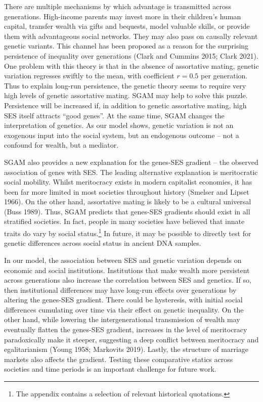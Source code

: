 \documentclass[
]{article}
\theoremstyle{definition}
\theoremstyle{definition}
\theoremstyle{definition}
\theoremstyle{definition}
\theoremstyle{remark}
\begin{document}
There are multiple mechanisms by which advantage is transmitted across
generations. High-income parents may invest more in their children's human
capital, transfer wealth via gifts and bequests, model valuable skills, or
provide them with advantageous social networks. They may also pass on causally
relevant genetic variants. This channel has been proposed as a reason for the
surprising persistence of inequality over generations
(Clark and Cummins 2015; Clark 2021). One problem with this theory is
that in the absence of assortative mating, genetic variation regresses swiftly
to the mean, with coefficient \(r = 0.5\) per generation. Thus to explain long-run
persistence, the genetic theory seems to require very high levels of genetic
assortative mating. SGAM may help to solve this puzzle. Persistence will be
increased if, in addition to genetic assortative mating, high SES itself
attracts ``good genes''. At the same time, SGAM changes the interpretation of
genetics. As our model shows, genetic variation is not an exogenous input into
the social system, but an endogenous outcome -- not a confound for wealth, but a mediator.

SGAM also provides a new explanation for the genes-SES gradient -- the observed
association of genes with SES. The leading alternative explanation is
meritocratic social mobility. Whilst meritocracy exists in modern capitalist
economies, it has been far more limited in most societies throughout history
(Smelser and Lipset 1966). On the other hand, assortative mating is likely to be a
cultural universal (Buss 1989). Thus, SGAM predicts that genes-SES gradients
should exist in all stratified societies. In fact, people in many societies have
believed that innate traits do vary by social status.\footnote{The appendix contains a selection of relevant historical quotations.} In future, it may be
possible to directly test for genetic differences across social status in
ancient DNA samples.

In our model, the association between SES and genetic variation depends on
economic and social institutions. Institutions that make wealth more persistent
across generations also increase the correlation between SES and genetics. If
so, then institutional differences may have long-run effects over generations by
altering the genes-SES gradient. There could be hysteresis, with initial social
differences cumulating over time via their effect on genetic inequality. On the
other hand, while lowering the intergenerational transmission of wealth may
eventually flatten the genes-SES gradient, increases in the level of meritocracy
paradoxically make it steeper, suggesting a deep conflict between meritocracy
and egalitarianism (Young 1958; Markovits 2019). Lastly, the
structure of marriage markets also affects the gradient. Testing these comparative
statics across societies and time periods is an important challenge for future work.
\end{document}

